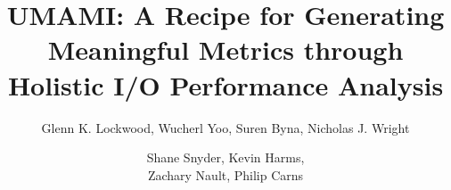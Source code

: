 \documentclass[sigconf,10pt]{acmart}
\begin{document}
\title{UMAMI: A Recipe for Generating Meaningful Metrics through Holistic I/O Performance Analysis}

\author{Glenn K. Lockwood, Wucherl Yoo, Suren Byna, Nicholas J. Wright}

\author{Shane Snyder, Kevin Harms,\\Zachary Nault, Philip Carns}

\renewcommand{\shortauthors}{G. Lockwood et al.}

\renewcommand{\shorttitle}{UMAMI: A Recipe for Generating Meaningful I/O Metrics}



\maketitle










\end{document}
